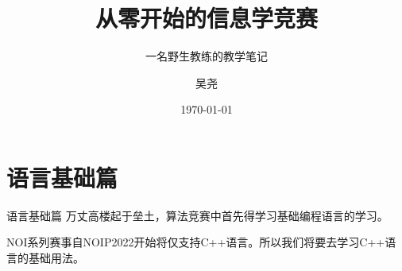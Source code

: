 \documentclass[lang=cn,10pt]{OIBooks}
\title{从零开始的信息学竞赛}
\subtitle{一名野生教练的教学笔记}
\author{吴尧}
\date{\today}
\begin{document}
\maketitle%


\tableofcontents%

\mainmatter
\part{语言基础篇}{语言基础篇}
万丈高楼起于垒土，算法竞赛中首先得学习基础编程语言的学习。

NOI系列赛事自NOIP2022开始将仅支持C++语言。所以我们将要去学习C++语言的基础用法。




\printbibliography[heading=bibintoc, title=\ebibname]
\appendix

\end{document}

